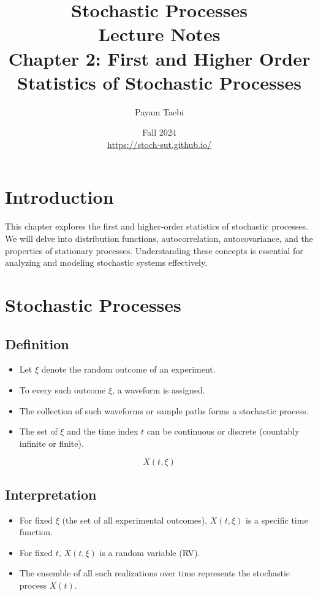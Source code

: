 \documentclass[12pt]{article}
\title{
    \vspace{-2cm}
    \LARGE{Stochastic Processes} \\
    \vspace{0.5cm}
    \Large{Lecture Notes} \\
    \vspace{0.5cm}
    \normalsize{Chapter 2: First and Higher Order Statistics of Stochastic Processes}
}
\author{
    Payam Taebi \\
    \vspace{0.2cm}
}
\date{
    Fall 2024 \\
    \vspace{0.2cm}
    \href{https://stoch-sut.github.io/}{https://stoch-sut.github.io/}
}
\begin{document}
\maketitle
\tableofcontents
\newpage

\section{Introduction}
This chapter explores the first and higher-order statistics of stochastic processes. We will delve into distribution functions, autocorrelation, autocovariance, and the properties of stationary processes. Understanding these concepts is essential for analyzing and modeling stochastic systems effectively.

\section{Stochastic Processes}
\subsection{Definition}
\begin{itemize}
    \item Let \( \xi \) denote the random outcome of an experiment.
    \item To every such outcome \( \xi \), a waveform is assigned.
    \item The collection of such waveforms or sample paths forms a stochastic process.
    \item The set of \( \xi \) and the time index \( t \) can be continuous or discrete (countably infinite or finite).
\end{itemize}

\[
X(t, \xi)
\]

\subsection{Interpretation}
\begin{itemize}
    \item For fixed \( \xi \) (the set of all experimental outcomes), \( X(t, \xi) \) is a specific time function.
    \item For fixed \( t \), \( X(t, \xi) \) is a random variable (RV).
    \item The ensemble of all such realizations over time represents the stochastic process \( X(t) \).
\end{itemize}
\end{document}
